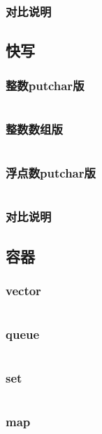     \subsubsection{对比说明}
      
  \subsection{快写}
    \subsubsection{整数putchar版}
      \inputminted{cpp}{src/2_STL和fastIO/2_快写/1_整数putchar版.cpp}
    \subsubsection{整数数组版}
      \inputminted{cpp}{src/2_STL和fastIO/2_快写/2_整数数组版.cpp}
    \subsubsection{浮点数putchar版}
      \inputminted{cpp}{src/2_STL和fastIO/2_快写/3_浮点数putchar版.cpp}
    \subsubsection{对比说明}
      
  \subsection{容器}
    \subsubsection{vector}
      \inputminted{cpp}{src/2_STL和fastIO/3_容器/1_vector.cpp}
    \subsubsection{queue}
      \inputminted{cpp}{src/2_STL和fastIO/3_容器/2_queue.cpp}
    \subsubsection{set}
      \inputminted{cpp}{src/2_STL和fastIO/3_容器/3_set.cpp}
    \subsubsection{map}
      \inputminted{cpp}{src/2_STL和fastIO/3_容器/4_map.cpp}
